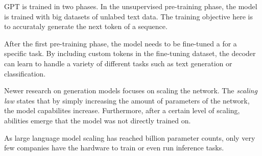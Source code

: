 \documentclass[../../main.tex]{subfiles}
\begin{document}
GPT is trained in two phases.
In the unsupervised pre-training phase,
the model is trained with big datasets of unlabed text data.
The training objective here is
to accurataly generate the next token of a sequence.

After the first pre-training phase,
the model needs to be fine-tuned a for a specific task.
By including custom tokens in the fine-tuning dataset,
the decoder can learn to handle a variety of different tasks
such as text generation or classification.

Newer research on generation models focuses on scaling the network.
The \textit{scaling law} states
that by simply increasing the amount of parameters of the network,
the model capabilites increase.
Furthermore,
after a certain level of scaling,
abilities emerge that the model was not directly trained on.

As large language model scaling has reached billion parameter counts,
only very few companies have the hardware to train or even run inference tasks.
\end{document}
